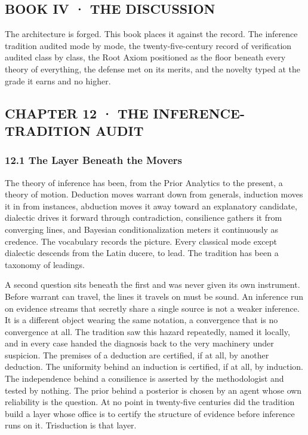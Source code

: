 \documentclass[10pt,twocolumn]{article}
\begin{document}
\hypertarget{book-iv-the-discussion}{%
\subsection{BOOK IV · THE DISCUSSION}\label{book-iv-the-discussion}}

The architecture is forged. This book places it against the record. The
inference tradition audited mode by mode, the twenty-five-century record
of verification audited class by class, the Root Axiom positioned as the
floor beneath every theory of everything, the defense met on its merits,
and the novelty typed at the grade it earns and no higher.

\hypertarget{chapter-12-the-inference-tradition-audit}{%
\subsection{CHAPTER 12 · THE INFERENCE-TRADITION
AUDIT}\label{chapter-12-the-inference-tradition-audit}}

\hypertarget{the-layer-beneath-the-movers}{%
\subsubsection{12.1 The Layer Beneath the
Movers}\label{the-layer-beneath-the-movers}}

The theory of inference has been, from the Prior Analytics to the
present, a theory of motion. Deduction moves warrant down from generals,
induction moves it in from instances, abduction moves it away toward an
explanatory candidate, dialectic drives it forward through
contradiction, consilience gathers it from converging lines, and
Bayesian conditionalization meters it continuously as credence. The
vocabulary records the picture. Every classical mode except dialectic
descends from the Latin ducere, to lead. The tradition has been a
taxonomy of leadings.

A second question sits beneath the first and was never given its own
instrument. Before warrant can travel, the lines it travels on must be
sound. An inference run on evidence streams that secretly share a single
source is not a weaker inference. It is a different object wearing the
same notation, a convergence that is no convergence at all. The
tradition saw this hazard repeatedly, named it locally, and in every
case handed the diagnosis back to the very machinery under suspicion.
The premises of a deduction are certified, if at all, by another
deduction. The uniformity behind an induction is certified, if at all,
by induction. The independence behind a consilience is asserted by the
methodologist and tested by nothing. The prior behind a posterior is
chosen by an agent whose own reliability is the question. At no point in
twenty-five centuries did the tradition build a layer whose office is to
certify the structure of evidence before inference runs on it.
Trisduction is that layer.
\end{document}
